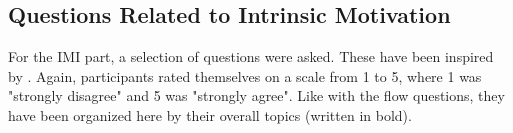 \subsection{Questions Related to Intrinsic Motivation}
For the IMI part, a selection of questions were asked. These have been inspired by \citep{imiOne}. Again, participants rated themselves on a scale from 1 to 5, where 1 was "strongly disagree" and 5 was "strongly agree". Like with the flow questions, they have been organized here by their overall topics (written in bold).


